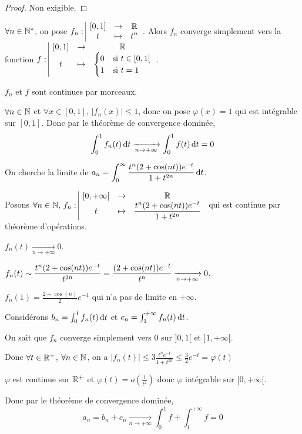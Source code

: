 \begin{proof}
    Non exigible. 
\end{proof}

\begin{exemple}
    $\forall n \in \mathbb{N}^*$, on pose $f_n: \space \begin{array}{|ccc} \displaystyle [0, 1] & \to & \displaystyle \mathbb{R} \\ \displaystyle t & \mapsto & \displaystyle t^n \end{array}$. 
    Alors $f_n$ converge simplement vers la fonction $f: \space \begin{array}{|ccc} \displaystyle [0, 1] & \to & \displaystyle \mathbb{R} \\ \displaystyle t & \mapsto & \displaystyle \begin{cases}
        0 & \text{si } t \in [0, 1[ \\
        1 & \text{si } t = 1
    \end{cases} \end{array}$.

    \svspace $f_n$ et $f$ sont continues par morceaux. 

    $\forall n \in \mathbb{N}$ et $\forall x \in [0, 1], \, |f_n(x)| \leqslant 1$, donc on pose 
    $\varphi(x) = 1$ qui est intégrable sur $[0, 1]$. Donc par le théorème de convergence 
    dominée, $$\int_0^1 f_n(t) \,\mathrm{d}t \xrightarrow[n \to + \infty]{} \int_0^1 f(t) \,\mathrm{d}t = 0$$
\end{exemple}

\begin{exemple}
    On cherche la limite de $\displaystyle a_n = \int_{0 }^{ \infty } \frac{t^n(2 + \cos (nt)) e^{-t}}{1 + t^{2n}} \,\mathrm{d}t$.

    \svspace Posons $\forall n \in \mathbb{N}, \, f_n: \space \begin{array}{|ccc} \displaystyle [0, + \infty[ & \to & \displaystyle \mathbb{R} \\ \displaystyle t & \mapsto & \displaystyle \frac{t^n(2 + \cos (nt)) e^{-t}}{1 + t^{2n}} \end{array}$ qui
    est continue par théorème d'opérations.


    \avspace $f_n(t) \xrightarrow[n \to + \infty]{} 0$.


    \avspace $\displaystyle f_n(t) \sim \frac{t^n(2 + \cos(nt))e^{-t}}{t^{2n}} = \frac{(2 + \cos(nt))e^{-t}}{t^n} \xrightarrow[n \to + \infty]{} 0$.

    $f_n(1) = \frac{2 + \cos(n)}{2}e^{-1}$ qui n'a pas de limite en $+\infty$. 

    Considérons $b_n = \int_0^1 f_n(t) \,\mathrm{d}t$ et $c_n = \int_1^{+ \infty} f_n(t) \,\mathrm{d}t$.

    On sait que $f_n$ converge simplement vers $0$ sur $]0, 1[$ et $]1, + \infty[$.

    Donc $\forall t \in \mathbb{R}^+$, $\forall n \in \mathbb{N}$, on a $|f_n(t)| \leqslant 3 \frac{t^n e^{-t}}{1 + t^{2n}} \leqslant \frac 3 2 e^{-t} = \varphi(t)$

    $\varphi$ est continue sur $\mathbb{R}^+$ et $\varphi(t) = o\left( \frac 1 {t^2} \right)$ donc $\varphi$ 
    intégrable sur $[0, + \infty[$.

    Donc par le théorème de convergence dominée, $$a_n = b_n + c_n \xrightarrow[n \to + \infty]{} \int_{0}^{1} f + \int_1^{+ \infty} f = 0$$
\end{exemple}

